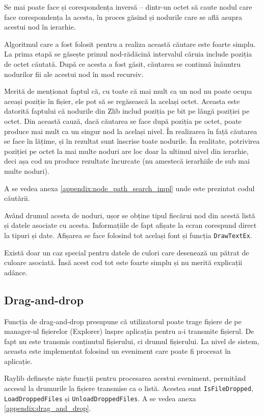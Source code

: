 \documentclass[a4paper,12pt]{report}
\begin{document}
Se mai poate face și corespondența inversă -- dintr-un octet să caute nodul care face corespondența la acesta,
în proces găsind și nodurile care se află asupra acestui nod în ierarhie.

Algoritmul care a fost folosit pentru a realiza această căutare este foarte simplu.
La prima etapă se găsește primul nod-rădăcină intervalul căruia include poziția de octet căutată.
După ce acesta a fost găsit, căutarea se continuă înăuntru nodurilor fii ale acestui nod în mod recursiv.

Merită de menționat faptul că, cu toate că mai mult ca un nod nu poate ocupa aceași poziție în fișier,
ele pot să se regăsească la același octet.
Aceasta este datorită faptului că nodurile din Zlib includ poziția pe bit pe lângă poziției pe octet.
Din această cauză, dacă căutarea se face după poziția pe octet,
poate produce mai mult ca un singur nod la același nivel.
În realizarea în față căutarea se face în lățime, și în rezultat sunt înscrise toate nodurile.
În realitate, potrivirea poziției pe octet la mai multe noduri are loc doar la ultimul nivel din ierarhie,
deci așa cod nu produce rezultate încurcate (nu amestecă ierarhiile de sub mai multe noduri).

A se vedea anexa \ref{appendix:node_path_search_impl} unde este prezintat codul căutării.

Având drumul acesta de noduri, ușor se obține tipul fiecărui
nod din acestă listă și datele asociate cu acesta.
Informațiile de fapt afișate la ecran corespund direct la tipuri și date.
Afișarea se face folosind tot același font și funcția \texttt{DrawTextEx}.

Există doar un caz special pentru datele de culori care desenează un pătrat de culoare asociată.
Însă acest cod tot este foarte simplu și nu merită explicații adânce.

\subsection{Drag-and-drop}

Funcția de drag-and-drop presupune că utilizatorul poate trage fișiere
de pe manager-ul fișierelor (Explorer) înspre aplicația pentru a-i transmite fișierul.
De fapt nu este transmis conținutul fișierului, ci drumul fișierului.
La nivel de sistem, aceasta este implementat folosind un eveniment care poate fi procesat în aplicație.

Raylib definește niște funcții pentru procesarea acestui eveniment,
permitând accesul la drumurile la fișiere transmise ca o listă.
Acestea sunt \texttt{IsFileDropped}, \texttt{LoadDroppedFiles} și \texttt{UnloadDroppedFiles}.
A se vedea anexa \ref{appendix:drag_and_drop}.
\end{document}
